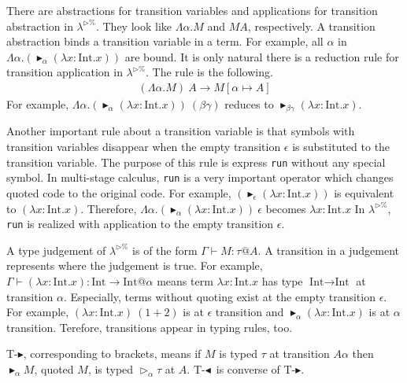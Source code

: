 \documentclass[runningheads]{llncs}
\newcommand{\LTP}{$\lambda^{\triangleright\%}$\xspace}
\newcommand{\G}{\Gamma}
\newcommand{\TW}{\triangleright}
\newcommand{\TB}{\blacktriangleright}
\newcommand{\TBL}{\blacktriangleleft}
\newcommand{\TTB}{\textsc{T-$\TB$}}
\newcommand{\TTBL}{\textsc{T-$\TBL$}}
\newcommand{\I}{\textrm{Int}}
\begin{document}

There are abstractions for transition variables and applications for transition abstraction in \LTP.
They look like $\Lambda\alpha.M$ and $M A$, respectively.
A transition abstraction binds a transition variable in a term.
For example, all $\alpha$ in $\Lambda\alpha.(\TB_\alpha (\lambda x:\I.x))$ are bound.
It is only natural there is a reduction rule for transition application in \LTP.
The rule is the following.
\begin{align*}
    (\Lambda\alpha.M)\ A \longrightarrow M[\alpha\mapsto A] 
\end{align*}
For example, $\Lambda\alpha.(\TB_\alpha (\lambda x:\I.x))\ (\beta\gamma)$ reduces to $\TB_{\beta\gamma} (\lambda x:\I.x)$.


Another important rule about a transition variable is 
that symbols with transition variables disappear 
when the empty transition $\epsilon$ is substituted to the transition variable.
The purpose of this rule is express \verb|run| without any special symbol.
In multi-stage calculus, \verb|run| is a very important operator which changes quoted code to the original code.
For example, $(\TB_\epsilon (\lambda x:\I.x))$ is equivalent to $(\lambda x:\I.x)$.
Therefore, $\Lambda\alpha.(\TB_\alpha (\lambda x:\I.x))\ \epsilon$ becomes $\lambda x:\I.x$
In \LTP, \verb|run| is realized with application to the empty transition $\epsilon$.


A type judgement of \LTP is of the form $\G \vdash M : \tau @ A$.
A transition in a judgement represents where the judgement is true.
For example, $\G \vdash (\lambda x:\I.x) : \I \to \I @ \alpha$ means 
term $\lambda x:\I.x$ has type $\I \to \I$ at transition $\alpha$.
Especially, terms without quoting exist at the empty transition $\epsilon$.
For example, $(\lambda x:\I.x)\ (1+2)$ is at $\epsilon$ transition and 
$\TB_\alpha (\lambda x:\I.x)$ is at $\alpha$ transition.
Terefore, transitions appear in typing rules, too.
\begin{center}
    \infrule{\G\vdash M:\tau @{A\alpha}}{\G\vdash \TB_{\alpha}M:\TW_{\alpha}\tau @A}{\TTB} \andalso
    \infrule{\G\vdash M:\TW_{\alpha}\tau @A}{\G\vdash \TBL_{\alpha}M:\tau @{A\alpha}}{\TTBL}
\end{center}
\TTB, corresponding to brackets, means 
if $M$ is typed $\tau$ at transition $A\alpha$ then $\TB_{\alpha}M$, quoted $M$, is typed $\TW_{\alpha}\tau$ at $A$.
\TTBL\ is converse of \TTB.
\end{document}
